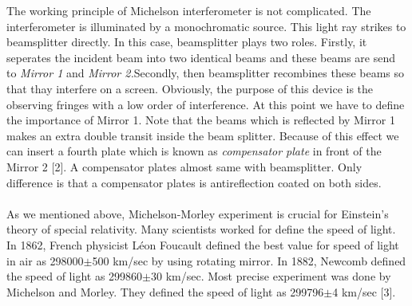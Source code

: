 \documentclass[a4paper,12pt]{report}
\begin{document}
The working principle of Michelson interferometer is not complicated. The interferometer is illuminated by a monochromatic source. This light ray strikes to beamsplitter directly. In this case, beamsplitter plays two roles. Firstly, it seperates the incident beam into two identical beams and these beams are send to \textit{Mirror 1} and \textit{Mirror 2.}Secondly, then beamsplitter recombines these beams so that thay interfere on a screen. Obviously, the purpose of this device is the observing fringes with a low order of interference. At this point we have to define the importance of Mirror 1. Note that the beams which is reflected by Mirror 1 makes an extra double transit inside the beam splitter. Because of this effect we can insert a fourth plate which is known as \textit{compensator plate} in front of the Mirror 2 [2]. A compensator plates almost same with beamsplitter. Only difference is that a compensator plates is antireflection coated on both sides.\\\\
As we mentioned above, Michelson-Morley experiment is crucial for Einstein's theory of special relativity. Many scientists worked for define the speed of light. In 1862, French physicist L\'{e}on Foucault defined the best value for speed of light in air as 298000$\pm$500 km/sec by using rotating mirror. In 1882, Newcomb defined the speed of light as 299860$\pm$30 km/sec. Most precise experiment was done by Michelson and Morley. They defined the speed of light as 299796$\pm$4 km/sec [3]. 
\end{document}
